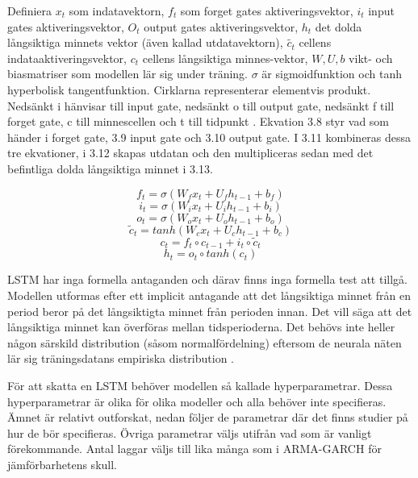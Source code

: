 \documentclass[11pt]{article}
\numberwithin{equation}{section}
\numberwithin{table}{section}
\numberwithin{figure}{section}
\begin{document}
Definiera \(x_t\) som indatavektorn, \(f_t\) som forget gates aktiveringsvektor, \(i_t\) input gates aktiveringsvektor, \(O_t\) output gates aktiveringsvektor, \(h_t\) det dolda långsiktiga minnets vektor (även kallad utdatavektorn), \(\tilde{c_t}\) cellens indataaktiveringsvektor, \(c_t\) cellens långsiktiga minnes-vektor, \(W, U, b\) vikt- och biasmatriser som modellen lär sig under träning. \(\sigma\) är sigmoidfunktion och tanh hyperbolisk tangentfunktion. Cirklarna representerar elementvis produkt. Nedsänkt i hänvisar till input gate, nedsänkt o till output gate, nedsänkt f till forget gate, c till minnescellen och t till tidpunkt \parencite[][,s.269-319]{purkait2019hands}. Ekvation 3.8 styr vad som händer i forget gate, 3.9 input gate och 3.10 output gate. I 3.11 kombineras dessa tre ekvationer, i 3.12 skapas utdatan och den multipliceras sedan med det befintliga dolda långsiktiga minnet i 3.13.

\begin{equation}f_t = \sigma(W_f x_t + U_f h_{t-1} + b_f)\end{equation}
\begin{equation}i_t = \sigma(W_i x_t + U_i h_{t-1} + b_i)\end{equation}
\begin{equation}o_t = \sigma(W_o x_t + U_o h_{t-1} + b_o)\end{equation}
\begin{equation}\tilde{c}_t = tanh(W_c x_t + U_c h_{t-1} + b_c)\end{equation}
\begin{equation}c_t= f_t \circ c_{t-1} + i_t \circ \tilde{c}_t\end{equation}
\begin{equation}h_t= o_t \circ tanh(c_t)\end{equation}

LSTM har inga formella antaganden och därav finns inga formella test att tillgå. Modellen utformas efter ett implicit antagande att det långsiktiga minnet från en period beror på det långsiktigta minnet från perioden innan. Det vill säga att det långsiktiga minnet kan överföras mellan tidsperioderna. Det behövs inte heller någon särskild distribution (såsom normalfördelning) eftersom de neurala näten lär sig träningsdatans empiriska distribution \parencite[][,s.269-319]{purkait2019hands}.

För att skatta en LSTM behöver modellen så kallade hyperparametrar. Dessa hyperparametrar är olika för olika modeller och alla behöver inte specifieras. Ämnet är relativt outforskat, nedan följer de parametrar där det finns studier på hur de bör specifieras. Övriga parametrar väljs utifrån vad som är vanligt förekommande. Antal laggar väljs till lika många som i ARMA-GARCH för jämförbarhetens skull.
\end{document}
